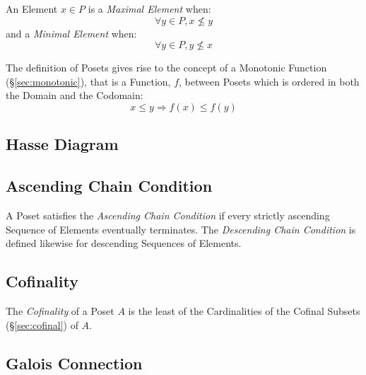 An Element $x \in P$ is a \emph{Maximal Element} when:
\[
  \forall y \in P, x \nleq y
\]
and a \emph{Minimal Element} when:
\[
  \forall y \in P, y \nleq x
\]

The definition of Posets gives rise to the concept of a Monotonic
Function (\S\ref{sec:monotonic}), that is a Function, $f$, between
Posets which is ordered in both the Domain and the Codomain:
\[
  x \leq y \Rightarrow f(x) \leq f(y)
\]



\subsection{Hasse Diagram}\label{sec:hasse_diagram}

\subsection{Ascending Chain Condition}\label{sec:ascending_chain}

A Poset satisfies the \emph{Ascending Chain Condition} if every
strictly ascending Sequence of Elements eventually terminates. The
\emph{Descending Chain Condition} is defined likewise for descending
Sequences of Elements.



\subsection{Cofinality}\label{sec:cofinality}

The \emph{Cofinality} of a Poset $A$ is the least of the Cardinalities
of the Cofinal Subsets (\S\ref{sec:cofinal}) of $A$.



\subsection{Galois Connection}\label{sec:galois_connection}

